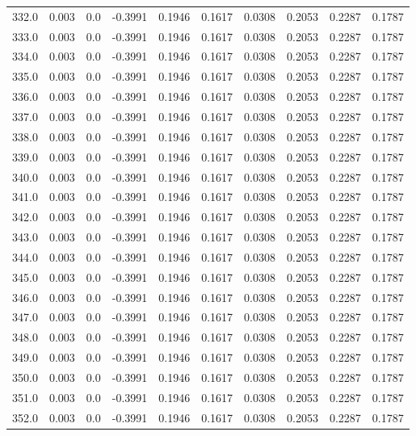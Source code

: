 \begin{longtable}{lrrrrrrrrr}
332.0 & 0.003 & 0.0 & -0.3991 & 0.1946 & 0.1617 & 0.0308 & 0.2053 & 0.2287 & 0.1787 \\
333.0 & 0.003 & 0.0 & -0.3991 & 0.1946 & 0.1617 & 0.0308 & 0.2053 & 0.2287 & 0.1787 \\
334.0 & 0.003 & 0.0 & -0.3991 & 0.1946 & 0.1617 & 0.0308 & 0.2053 & 0.2287 & 0.1787 \\
335.0 & 0.003 & 0.0 & -0.3991 & 0.1946 & 0.1617 & 0.0308 & 0.2053 & 0.2287 & 0.1787 \\
336.0 & 0.003 & 0.0 & -0.3991 & 0.1946 & 0.1617 & 0.0308 & 0.2053 & 0.2287 & 0.1787 \\
337.0 & 0.003 & 0.0 & -0.3991 & 0.1946 & 0.1617 & 0.0308 & 0.2053 & 0.2287 & 0.1787 \\
338.0 & 0.003 & 0.0 & -0.3991 & 0.1946 & 0.1617 & 0.0308 & 0.2053 & 0.2287 & 0.1787 \\
339.0 & 0.003 & 0.0 & -0.3991 & 0.1946 & 0.1617 & 0.0308 & 0.2053 & 0.2287 & 0.1787 \\
340.0 & 0.003 & 0.0 & -0.3991 & 0.1946 & 0.1617 & 0.0308 & 0.2053 & 0.2287 & 0.1787 \\
341.0 & 0.003 & 0.0 & -0.3991 & 0.1946 & 0.1617 & 0.0308 & 0.2053 & 0.2287 & 0.1787 \\
342.0 & 0.003 & 0.0 & -0.3991 & 0.1946 & 0.1617 & 0.0308 & 0.2053 & 0.2287 & 0.1787 \\
343.0 & 0.003 & 0.0 & -0.3991 & 0.1946 & 0.1617 & 0.0308 & 0.2053 & 0.2287 & 0.1787 \\
344.0 & 0.003 & 0.0 & -0.3991 & 0.1946 & 0.1617 & 0.0308 & 0.2053 & 0.2287 & 0.1787 \\
345.0 & 0.003 & 0.0 & -0.3991 & 0.1946 & 0.1617 & 0.0308 & 0.2053 & 0.2287 & 0.1787 \\
346.0 & 0.003 & 0.0 & -0.3991 & 0.1946 & 0.1617 & 0.0308 & 0.2053 & 0.2287 & 0.1787 \\
347.0 & 0.003 & 0.0 & -0.3991 & 0.1946 & 0.1617 & 0.0308 & 0.2053 & 0.2287 & 0.1787 \\
348.0 & 0.003 & 0.0 & -0.3991 & 0.1946 & 0.1617 & 0.0308 & 0.2053 & 0.2287 & 0.1787 \\
349.0 & 0.003 & 0.0 & -0.3991 & 0.1946 & 0.1617 & 0.0308 & 0.2053 & 0.2287 & 0.1787 \\
350.0 & 0.003 & 0.0 & -0.3991 & 0.1946 & 0.1617 & 0.0308 & 0.2053 & 0.2287 & 0.1787 \\
351.0 & 0.003 & 0.0 & -0.3991 & 0.1946 & 0.1617 & 0.0308 & 0.2053 & 0.2287 & 0.1787 \\
352.0 & 0.003 & 0.0 & -0.3991 & 0.1946 & 0.1617 & 0.0308 & 0.2053 & 0.2287 & 0.1787 \\

\end{longtable}
